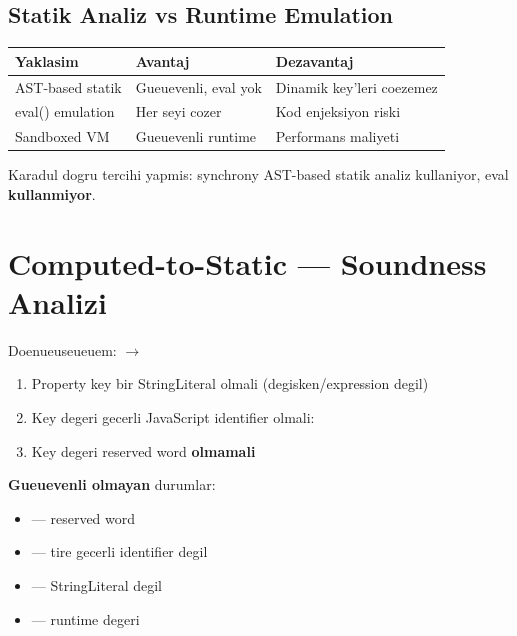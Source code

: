 \subsection{Statik Analiz vs Runtime Emulation}

\begin{table}[ht]
\centering
\begin{tabular}{p{3.5cm}p{4cm}p{4cm}}
\toprule
\textbf{\color{sectioncyan}Yaklasim} & \textbf{\color{sectioncyan}Avantaj} & \textbf{\color{sectioncyan}Dezavantaj} \\
\midrule
AST-based statik & Gueuevenli, eval yok & Dinamik key'leri coezemez \\
eval() emulation & Her seyi cozer & Kod enjeksiyon riski \\
Sandboxed VM & Gueuevenli runtime & Performans maliyeti \\
\bottomrule
\end{tabular}
\end{table}

Karadul dogru tercihi yapmis: synchrony AST-based statik analiz kullaniyor, eval \textbf{kullanmiyor}.


\section{Computed-to-Static --- Soundness Analizi}
\label{sec:computed-deep}

Doenueuseueuem:  $\to$ 

\begin{tanim}
\begin{enumerate}
\item Property key bir StringLiteral olmali (degisken/expression degil)
\item Key degeri gecerli JavaScript identifier olmali: \code{/\^{}[a-zA-Z\_\$][a-zA-Z0-9\_\$]*\$/}
\item Key degeri reserved word \textbf{olmamali}
\end{enumerate}
\end{tanim}

\textbf{Gueuevenli olmayan} durumlar:
\begin{itemize}
\item {} --- reserved word
\item {} --- tire gecerli identifier degil
\item {} --- StringLiteral degil
\item {} --- runtime degeri
\end{itemize}

